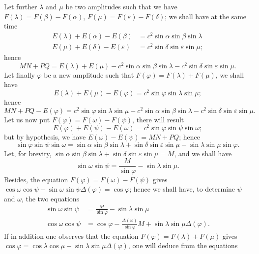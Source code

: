 \documentclass{article}
\begin{document}
Let further $\lambda$ and $\mu$ be two amplitudes such that we have $F(\lambda)=F(\beta)-F(\alpha)$, $F(\mu)=F(\varepsilon)-F(\delta)$; we shall have at the same time
\[ \begin{aligned} E(\lambda)+E(\alpha)-E(\beta)&=c^{2}\sin\alpha\sin\beta\sin\lambda\\ E(\mu)+E(\delta)-E(\varepsilon)&=c^{2}\sin\delta\sin\varepsilon\sin\mu; \end{aligned} \]
hence
\[ MN+PQ=E(\lambda)+E(\mu)-c^{2}\sin\alpha\sin\beta\sin\lambda-c^{2}\sin\delta\sin\varepsilon\sin\mu. \]
Let finally $\varphi$ be a new amplitude such that $F(\varphi)=F(\lambda)+F(\mu)$, we shall have
\[ E(\lambda)+E(\mu)-E(\varphi)=c^{2}\sin\varphi\sin\lambda\sin\mu; \]
hence
\[ MN+PQ-E(\varphi)=c^{2}\sin\varphi\sin\lambda\sin\mu-c^{2}\sin\alpha\sin\beta\sin\lambda-c^{2}\sin\delta\sin\varepsilon\sin\mu. \]
Let us now put $F(\varphi)=F(\omega)-F(\psi)$, there will result
\[ E(\varphi)+E(\psi)-E(\omega)=c^{2}\sin\varphi\sin\psi\sin\omega; \]
but by hypothesis, we have $E(\omega)-E(\psi)=MN+PQ$; hence
\[ \sin\varphi\sin\psi\sin\omega=\sin\alpha\sin\beta\sin\lambda+\sin\delta\sin\varepsilon\sin\mu-\sin\lambda\sin\mu\sin\varphi. \]
Let, for brevity, $\sin\alpha\sin\beta\sin\lambda+\sin\delta\sin\varepsilon\sin\mu=M$, and we shall have
\[ \sin\omega\sin\psi=\frac{M}{\sin\varphi}-\sin\lambda\sin\mu. \]
Besides, the equation $F(\varphi)=F(\omega)-F(\psi)$ gives $\cos\omega\cos\psi+\sin\omega\sin\psi\Delta(\varphi)=\cos\varphi$; hence we shall have, to determine $\psi$ and $\omega$, the two equations
\[ \begin{aligned} \sin\omega\sin\psi&=\frac{M}{\sin\varphi}-\sin\lambda\sin\mu\\ \cos\omega\cos\psi&=\cos\varphi-\frac{\Delta(\varphi)}{\sin\varphi}M+\sin\lambda\sin\mu\Delta(\varphi). \end{aligned} \]
If in addition one observes that the equation $F(\varphi)=F(\lambda)+F(\mu)$ gives $\cos\varphi=\cos\lambda\cos\mu-\sin\lambda\sin\mu\Delta(\varphi)$, one will deduce from the equations
\end{document}

